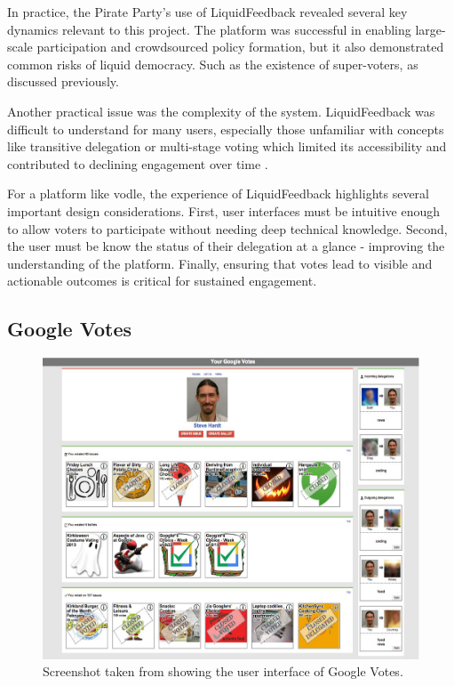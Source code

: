 In practice, the Pirate Party's use of LiquidFeedback revealed several key dynamics relevant to this project. The platform was successful in enabling large-scale participation and crowdsourced policy formation, but it also demonstrated common risks of liquid democracy. Such as the existence of super-voters, as discussed previously.

Another practical issue was the complexity of the system. LiquidFeedback was difficult to understand for many users, especially those unfamiliar with concepts like transitive delegation or multi-stage voting which limited its accessibility and contributed to declining engagement over time \citep{kling2015votingbehaviourpoweronline}.

For a platform like vodle, the experience of LiquidFeedback highlights several important design considerations. First, user interfaces must be intuitive enough to allow voters to participate without needing deep technical knowledge. Second, the user must be know the status of their delegation at a glance - improving the understanding of the platform. Finally, ensuring that votes lead to visible and actionable outcomes is critical for sustained engagement.

\subsection{Google Votes}
\begin{figure}[h!]
    \centering
    \includegraphics[width=0.8\linewidth]{../common/google_votes.png}
    \caption{Screenshot taken from \cite{hardt_google_2015} showing the user interface of Google Votes.}
\end{figure}

